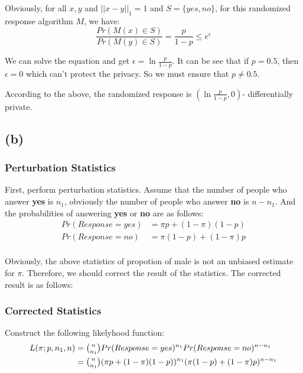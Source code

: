 \documentclass[a4paper,12pt]{article}
\begin{document}
Obviously, for all $x, y$ and $||x - y||_1 = 1$ and $S = \{yes, no\}$, for this randomized response algorithm $M$, we have:
\begin{equation}
    \frac{Pr(M(x) \in S)}{Pr(M(y) \in S)} = \frac{p}{1 - p} \leq e^{\epsilon}
\end{equation}

We can solve the equation and get $\epsilon = \ln{\frac{p}{1 - p}}$.
It can be see that if $p = 0.5$, then $\epsilon = 0$ which can't protect the privacy. So we must ensure that $p \neq 0.5$.

According to the above, the randomized response is $(\ln{\frac{p}{1 - p}}, 0)$-
\newline
differentially private.
\subsection{(b)}
\subsubsection{Perturbation Statistics}
First, perform perturbation statistics. Assume that the number of people who answer \textbf{yes} is $n_1$, obviously the number of people who answer \textbf{no} is $n - n_1$. And the probabilities of answering \textbf{yes} or \textbf{no} are as follows:
\begin{equation}
    \begin{aligned}
        Pr(Response = yes) & = \pi p + (1 - \pi)(1 - p) \\
        Pr(Response = no)  & = \pi (1 - p) + (1 - \pi)p \\
    \end{aligned}
\end{equation}

Obviously, the above statistics of propotion of male is not an unbiased estimate for $\pi$. Therefore, we should correct the result of the statistics. The corrected result is as follows:
\subsubsection{Corrected Statistics}
Construct the following likelyhood function:
\begin{equation}
    \begin{aligned}
        L(\pi; p, n_1, n) & = \tbinom{n}{n_1}Pr(Response = yes)^{n_1}Pr(Response = no)^{n - n_1}                  \\
                          & = \tbinom{n}{n_1}(\pi p + (1 - \pi)(1 - p))^{n_1}(\pi (1 - p) + (1 - \pi)p)^{n - n_1} \\
    \end{aligned}
\end{equation}
\end{document}
